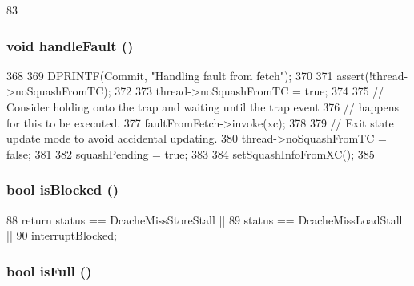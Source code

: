\begin{DoxyCode}
83 { }
\end{DoxyCode}
\hypertarget{classInorderBackEnd_acd8f81ae1aa6143073f58ab038f684f0}{
\subsubsection[{handleFault}]{\setlength{\rightskip}{0pt plus 5cm}void handleFault ()}}
\label{classInorderBackEnd_acd8f81ae1aa6143073f58ab038f684f0}



\begin{DoxyCode}
368 {
369     DPRINTF(Commit, "Handling fault from fetch\n");
370 
371     assert(!thread->noSquashFromTC);
372 
373     thread->noSquashFromTC = true;
374 
375     // Consider holding onto the trap and waiting until the trap event
376     // happens for this to be executed.
377     faultFromFetch->invoke(xc);
378 
379     // Exit state update mode to avoid accidental updating.
380     thread->noSquashFromTC = false;
381 
382     squashPending = true;
383 
384     setSquashInfoFromXC();
385 }
\end{DoxyCode}
\hypertarget{classInorderBackEnd_ae6ec007d68382eb124ed25bc90ae9c17}{
\subsubsection[{isBlocked}]{\setlength{\rightskip}{0pt plus 5cm}bool isBlocked ()}}
\label{classInorderBackEnd_ae6ec007d68382eb124ed25bc90ae9c17}



\begin{DoxyCode}
88                      { return status == DcacheMissStoreStall ||
89                            status == DcacheMissLoadStall ||
90                            interruptBlocked; }
\end{DoxyCode}
\hypertarget{classInorderBackEnd_a3e70330939fdfc4dbc2f60c1a660584d}{
\subsubsection[{isFull}]{\setlength{\rightskip}{0pt plus 5cm}bool isFull ()}}
\label{classInorderBackEnd_a3e70330939fdfc4dbc2f60c1a660584d}



